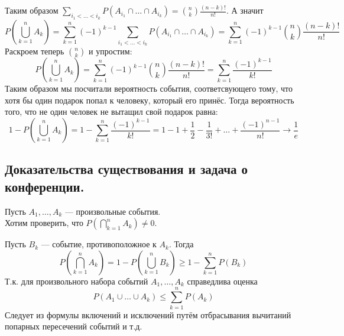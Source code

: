 Таким образом
$\sum\limits_{i_1 < \ldots < i_k} P(A_{i_1} \cap \ldots \cap A_{i_k}) = \binom{n}{k}\frac{(n - k)!}{n!}$. А значит
\[
    P\left( \bigcup\limits_{k = 1}^n A_k \right) = \sum\limits_{k = 1}^n (-1)^{k - 1}
    \sum\limits_{i_1 < \ldots < i_k} P(A_{i_1} \cap \ldots \cap A_{i_k}) =
    \sum\limits_{k = 1}^n (-1)^{k - 1}\binom{n}{k}\frac{(n - k)!}{n!}
\]
Раскроем теперь $\binom{n}{k}$ и упростим:
\[
    P\left( \bigcup\limits_{k = 1}^n A_k \right) =
    \sum\limits_{k = 1}^n (-1)^{k - 1} \binom{n}{k}\frac{(n - k)!}{n!} =
    \sum\limits_{k = 1}^n \frac{(-1)^{k - 1}}{k!}
\]
Таким образом мы посчитали вероятность события, соответсвующего тому, что хотя бы один подарок попал к человеку, который его
принёс. Тогда вероятность того, что не один человек не вытащил свой подарок равна:
\[
    1 - P\left( \bigcup\limits_{k = 1}^n A_k \right) =
    1 - \sum\limits_{k = 1}^n \frac{(-1)^{k - 1}}{k!} =
    1 - 1 + \frac{1}{2} - \frac{1}{3!} + \ldots + \frac{(-1)^{n - 1}}{n!} \to \frac{1}{e}
\]

\subsection{Доказательства существования и задача о конференции.}
Пусть $A_1, \ldots, A_k$ --- произвольные события.\\
Хотим проверить, что $P\left( \bigcap\limits_{k = 1}^n A_k \right) \neq 0$.

Пусть $B_k$ --- событие, противоположное к $A_k$. Тогда
\[
    P\left( \bigcap\limits_{k = 1}^n A_k \right) =
    1 - P\left( \bigcup\limits_{k = 1}^n B_k \right) \geq
    1 - \sum\limits_{k = 1}^n P(B_k)
\]
Т.к. для произвольного набора событий $A_1, \ldots, A_k$ справедлива оценка
\[
    P(A_1 \cup \ldots \cup A_k) \leq \sum\limits_{k = 1}^n P(A_k)
\]
Следует из формулы включений и исключений путём отбрасывания вычитаний попарных пересечений событий и т.д.

